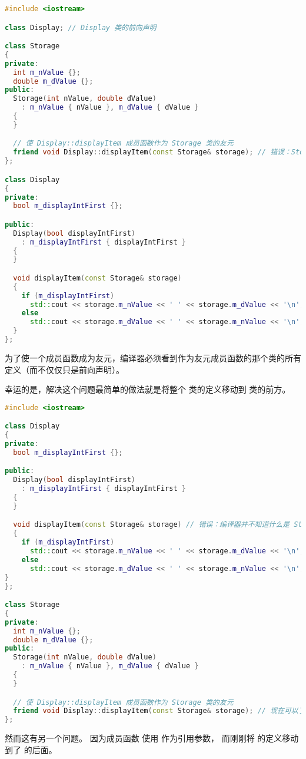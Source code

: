 \documentclass[../../LearnCpp.tex]{subfiles}
\begin{document}
\begin{lstlisting}[language=C++]
#include <iostream>

class Display; // Display 类的前向声明

class Storage
{
private:
  int m_nValue {};
  double m_dValue {};
public:
  Storage(int nValue, double dValue)
    : m_nValue { nValue }, m_dValue { dValue }
  {
  }

  // 使 Display::displayItem 成员函数作为 Storage 类的友元
  friend void Display::displayItem(const Storage& storage); // 错误：Storage 还未看到 Display 类的完整定义
};

class Display
{
private:
  bool m_displayIntFirst {};

public:
  Display(bool displayIntFirst)
    : m_displayIntFirst { displayIntFirst }
  {
  }

  void displayItem(const Storage& storage)
  {
    if (m_displayIntFirst)
      std::cout << storage.m_nValue << ' ' << storage.m_dValue << '\n';
    else
      std::cout << storage.m_dValue << ' ' << storage.m_nValue << '\n';
  }
};
\end{lstlisting}

为了使一个成员函数成为友元，编译器必须看到作为友元成员函数的那个类的所有定义（而不仅仅只是前向声明）。

幸运的是，解决这个问题最简单的做法就是将整个  类的定义移动到  类的前方。

\begin{lstlisting}[language=C++]
#include <iostream>

class Display
{
private:
  bool m_displayIntFirst {};

public:
  Display(bool displayIntFirst)
    : m_displayIntFirst { displayIntFirst }
  {
  }

  void displayItem(const Storage& storage) // 错误：编译器并不知道什么是 Storage
  {
    if (m_displayIntFirst)
      std::cout << storage.m_nValue << ' ' << storage.m_dValue << '\n';
    else
      std::cout << storage.m_dValue << ' ' << storage.m_nValue << '\n';
}
};

class Storage
{
private:
  int m_nValue {};
  double m_dValue {};
public:
  Storage(int nValue, double dValue)
    : m_nValue { nValue }, m_dValue { dValue }
  {
  }

  // 使 Display::displayItem 成员函数作为 Storage 类的友元
  friend void Display::displayItem(const Storage& storage); // 现在可以了
};
\end{lstlisting}

然而这有另一个问题。
因为成员函数  使用  作为引用参数，
而刚刚将  的定义移动到了  的后面。
\end{document}
